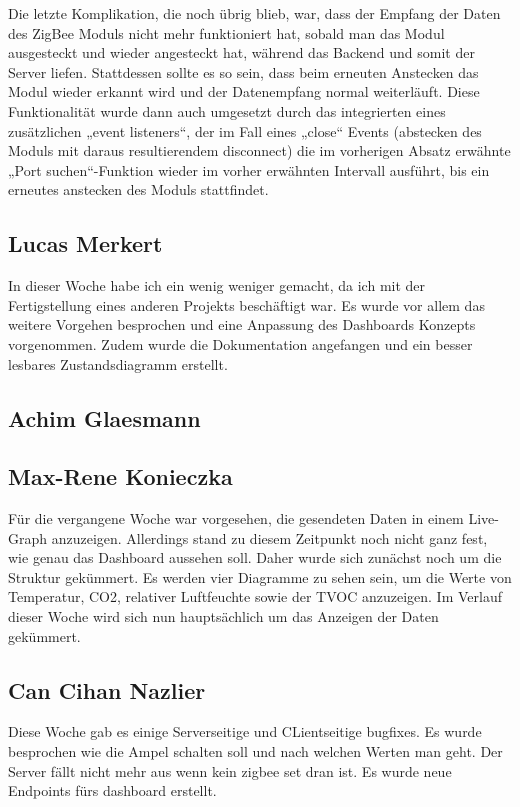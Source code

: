 \documentclass[]{article}
\begin{document}
Die letzte Komplikation, die noch übrig blieb, war, dass der Empfang der Daten des ZigBee Moduls nicht mehr funktioniert hat, sobald man das Modul ausgesteckt und wieder angesteckt hat, während das Backend und somit der Server liefen. Stattdessen sollte es so sein, dass beim erneuten Anstecken das Modul wieder erkannt wird und der Datenempfang normal weiterläuft. Diese Funktionalität wurde dann auch umgesetzt durch das integrierten eines zusätzlichen „event listeners“, der im Fall eines „close“ Events (abstecken des Moduls mit daraus resultierendem disconnect) die im vorherigen Absatz erwähnte „Port suchen“-Funktion wieder im vorher erwähnten Intervall ausführt, bis ein erneutes anstecken des Moduls stattfindet.


\subsection{Lucas Merkert}
In dieser Woche habe ich ein wenig weniger gemacht, da ich mit der Fertigstellung eines anderen Projekts beschäftigt war. Es wurde vor allem das weitere Vorgehen besprochen und eine Anpassung des Dashboards Konzepts vorgenommen. Zudem wurde die Dokumentation angefangen und ein besser lesbares Zustandsdiagramm erstellt.

\subsection{Achim Glaesmann}


\subsection{Max-Rene Konieczka}
Für die vergangene Woche war vorgesehen, die gesendeten Daten in einem Live-Graph anzuzeigen. Allerdings stand zu diesem Zeitpunkt noch nicht ganz fest, wie genau das Dashboard aussehen soll. Daher wurde sich zunächst noch um die Struktur gekümmert. Es werden vier Diagramme zu sehen sein, um die Werte von Temperatur, CO2, relativer Luftfeuchte sowie der TVOC anzuzeigen. Im Verlauf dieser Woche wird sich nun hauptsächlich um das Anzeigen der Daten gekümmert. 

\subsection{Can Cihan Nazlier}
Diese Woche gab es einige Serverseitige und CLientseitige bugfixes. Es wurde besprochen wie die Ampel schalten soll und nach welchen Werten man geht. Der Server fällt nicht mehr aus wenn kein zigbee set dran ist. Es wurde neue Endpoints fürs dashboard erstellt.

\printbibliography
\end{document}
